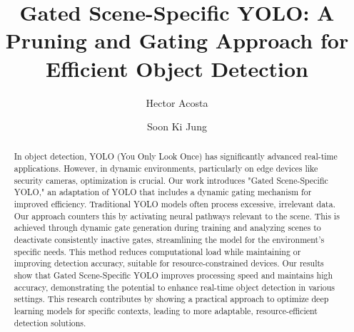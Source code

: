 \documentclass[runningheads]{llncs}
\begin{document}
\title{Gated Scene-Specific YOLO: A Pruning and Gating Approach for Efficient Object Detection}
%
\author{Hector Acosta \and
Soon Ki Jung}
%
%
\maketitle              %
%
\begin{abstract}
In object detection, YOLO (You Only Look Once) has significantly advanced real-time applications. However, in dynamic environments, particularly on edge devices like security cameras, optimization is crucial. Our work introduces "Gated Scene-Specific YOLO," an adaptation of YOLO that includes a dynamic gating mechanism for improved efficiency. Traditional YOLO models often process excessive, irrelevant data. Our approach counters this by activating neural pathways relevant to the scene. This is achieved through dynamic gate generation during training and analyzing scenes to deactivate consistently inactive gates, streamlining the model for the environment's specific needs. This method reduces computational load while maintaining or improving detection accuracy, suitable for resource-constrained devices. Our results show that Gated Scene-Specific YOLO improves processing speed and maintains high accuracy, demonstrating the potential to enhance real-time object detection in various settings. This research contributes by showing a practical approach to optimize deep learning models for specific contexts, leading to more adaptable, resource-efficient detection solutions.
%
\end{abstract}
%
\end{document}
